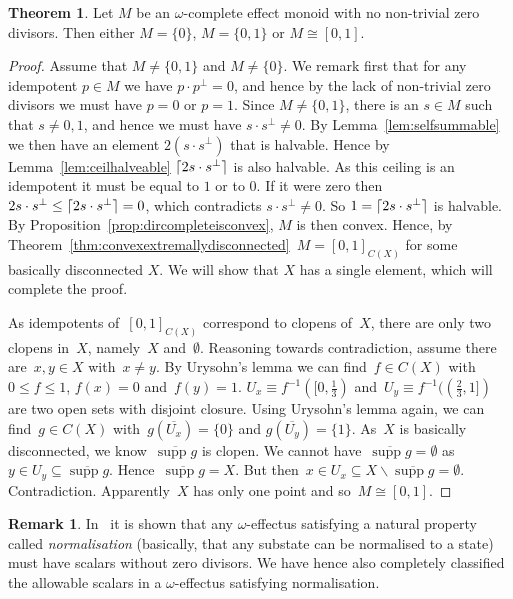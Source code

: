 \documentclass[10pt,conference]{IEEEtran}
\DeclarePairedDelimiter{\ceil}{\lceil}{\rceil}
\DeclareMathOperator{\supp}{supp}
\newcounter{counter}
\theoremstyle{definition}
\newtheorem{theorem}[counter]{Theorem}
\newtheorem{remark}[counter]{Remark}
\begin{document}
\begin{theorem}\label{thm:no-zero-divisors}
    Let $M$ be an $\omega$-complete effect monoid with no non-trivial
    zero divisors.
    Then either $M=\{0\}$, $M=\{0,1\}$ or $M\cong [0,1]$.
\end{theorem}
\begin{proof}
    Assume that $M\neq \{0,1\}$ and $M\neq \{0\}$. 
    We remark first that for any idempotent $p\in M$ we have $p\cdot p^\perp = 0$,
    and hence by the lack of non-trivial zero divisors we must have $p=0$ or $p=1$.
    Since $M\neq \{0,1\}$, there is an $s\in M$ such that $s\neq 0,1$, and hence
    we must have $s\cdot s^\perp \neq 0$. 
    By Lemma~\ref{lem:selfsummable} we then
    have an element $2(s\cdot s^\perp)$ that is halvable.
    Hence by Lemma~\ref{lem:ceilhalveable} 
    $\ceil{2s\cdot s^\perp}$ is also halvable.
    As this ceiling is an idempotent it must be equal to $1$ or to $0$. 
    If it were zero then 
    $2s\cdot s^\perp \leq \ceil{2s\cdot s^\perp} = 0$, 
    which contradicts $s\cdot s^\perp \neq 0$.
    So $1=\ceil{2s\cdot s^\perp}$ is halvable. 
    By Proposition~\ref{prop:dircompleteisconvex}, $M$ is then convex.
    Hence, by Theorem~\ref{thm:convexextremallydisconnected}~$M = [0,1]_{C(X)}$
        for some basically disconnected $X$.
    We will show that $X$ has a single element, which will complete the proof.
    

    As idempotents of~$[0,1]_{C(X)}$ correspond to clopens of~$X$,
        there are only two clopens in~$X$, namely~$X$ and~$\emptyset$.
    Reasoning towards contradiction,
        assume there are~$x,y \in X$ with~$x \neq y$.
    By Urysohn's lemma we can find~$f \in C(X)$
        with~$0 \leq f \leq 1$, $f(x) = 0$ and~$f(y) = 1$.
        $U_x \equiv f^{-1}([0,\frac13)$ and~$U_y\equiv f^{-1}((\frac23,1])$
        are two open sets with disjoint closure.
    Using Urysohn's lemma again, we can find~$g \in C(X)$
        with~$g(\overline{U_x}) = \{0\}$ and $g(\overline{U_y}) = \{1\}$.
    As~$X$ is basically disconnected,
        we know~$\overline{\supp g}$ is clopen.
    We cannot have~$\overline{\supp g} = \emptyset$
        as~$y \in U_y \subseteq \overline{\supp g}$.
        Hence~$\overline{\supp g} = X$.
        But then~$x \in U_x \subseteq X \backslash \overline{\supp g} = \emptyset$.
        Contradiction.
        Apparently~$X$ has only one point and so~$M \cong [0,1]$.
\end{proof}

\begin{remark}
In~\cite{kentathesis} it is shown that any $\omega$-effectus
    satisfying a natural property called \emph{normalisation} (basically,
    that any substate can be normalised to a  state) must have scalars
    without zero divisors. We have hence also completely classified the
    allowable scalars in a $\omega$-effectus satisfying normalisation.
\end{remark}
\end{document}
